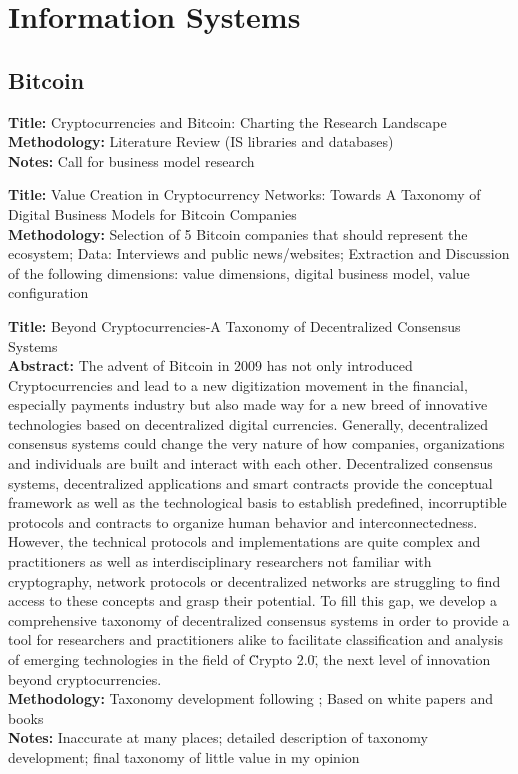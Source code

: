 \documentclass[a4paper, 12pt]{scrartcl}
\begin{document}
\section{Information Systems}

\subsection{Bitcoin}

\textbf{Title:} Cryptocurrencies and Bitcoin: Charting the Research Landscape \parencite{morisse2015cryptocurrencies} \\
\textbf{Methodology:} Literature Review (IS libraries and databases) \\
\textbf{Notes:} Call for business model research

\textbf{Title:} Value Creation in Cryptocurrency Networks: Towards A Taxonomy of Digital Business Models for Bitcoin Companies \parencite{kazan2015value} \\
\textbf{Methodology:} Selection of 5 Bitcoin companies that should represent the ecosystem; Data: Interviews and public news/websites; Extraction and Discussion of the following dimensions: value dimensions, digital business model, value configuration

\textbf{Title:} Beyond Cryptocurrencies-A Taxonomy of Decentralized Consensus Systems \parencite{glaser2015beyond} \\
\textbf{Abstract:} The advent of Bitcoin in 2009 has not only introduced Cryptocurrencies and lead to a new digitization movement in the financial, especially payments industry but also made way for a new breed of innovative technologies based on decentralized digital currencies. Generally, decentralized consensus systems could change the very nature of how companies, organizations and individuals are built and interact with each other. Decentralized consensus systems, decentralized applications and smart contracts provide the conceptual framework as well as the technological basis to establish predefined, incorruptible protocols and contracts to organize human behavior and interconnectedness. However, the technical protocols and implementations are quite complex and practitioners as well as interdisciplinary researchers not familiar with cryptography, network protocols or decentralized networks are struggling to find access to these concepts and grasp their potential. To fill this gap, we develop a comprehensive taxonomy of decentralized consensus systems in order to provide a tool for researchers and practitioners alike to facilitate classification and analysis of emerging technologies in the field of \"Crypto 2.0\", the next level of innovation beyond cryptocurrencies. \\
\textbf{Methodology:} Taxonomy development following \cite{nickerson2013method}; Based on white papers and books \\
\textbf{Notes:} Inaccurate at many places; detailed description of taxonomy development; final taxonomy of little value in my opinion
\end{document}
